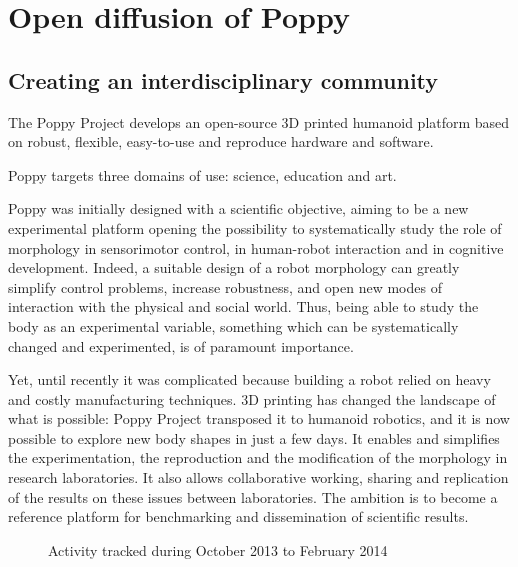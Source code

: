 
% 

\chapter{Open diffusion of Poppy} %


\section{Creating an interdisciplinary community} %

The Poppy Project develops an open-source 3D printed humanoid platform based on robust, flexible, easy-to-use and reproduce hardware and software.

Poppy targets three domains of use: science, education and art.

Poppy was initially designed with a scientific objective, aiming to be a new experimental platform opening the possibility to systematically study the role of morphology in sensorimotor control, in human-robot interaction and in cognitive development.
Indeed, a suitable design of a robot morphology can greatly simplify control problems, increase robustness, and open new modes of interaction with the physical and social world. Thus, being able to study the body as an experimental variable, something which can be systematically changed and experimented, is of paramount importance.

Yet, until recently it was complicated because building a robot relied on heavy and costly manufacturing techniques.
3D printing has changed the landscape of what is possible: Poppy Project transposed it to humanoid robotics, and it is now possible to explore new body shapes in just a few days.
It enables and simplifies the experimentation, the reproduction and the modification of the morphology in research laboratories. It also allows collaborative working, sharing and replication of the results on these issues between laboratories.
The ambition is to become a reference platform for benchmarking and dissemination of scientific results.

\begin{figure}[tb]
\centering
    \hfil
    \caption{Activity tracked during October 2013 to February 2014}
    \label{fig:poppy_community}
\end{figure}


